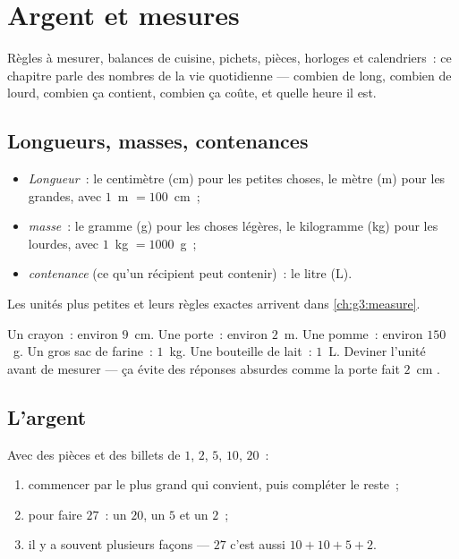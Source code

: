 \chapter{Argent et mesures}\label{ch:g2:measure}

Règles à mesurer, balances de cuisine, pichets, pièces,
horloges et calendriers~: ce chapitre parle des nombres de la vie
quotidienne --- combien de long, combien de lourd, combien ça
contient, combien ça coûte, et quelle heure il est.

\section{Longueurs, masses, contenances}

\begin{definition}\label{def:g2:measure:units}
\begin{itemize}
  \item \emph{Longueur}~: le centimètre (cm) pour les petites
        choses, le mètre (m) pour les grandes, avec
        $1$~m $= 100$~cm~;
  \item \emph{masse}~: le gramme (g) pour les choses légères, le
        kilogramme (kg) pour les lourdes, avec
        $1$~kg $= 1000$~g~;
  \item \emph{contenance} (ce qu'un récipient peut contenir)~: le
        litre (L).
\end{itemize}
Les unités plus petites et leurs règles exactes arrivent dans
\cref{ch:g3:measure}.
\end{definition}

\begin{example}\label{ex:g2:measure:choose}
Un crayon~: environ $9$~cm. Une porte~: environ $2$~m. Une pomme~:
environ $150$~g. Un gros sac de farine~: $1$~kg. Une bouteille de
lait~: $1$~L. Deviner l'unité avant de mesurer --- ça évite
des réponses absurdes comme \guillemotleft{} la porte fait
$2$~cm \guillemotright{}.
\end{example}

\section{L'argent}

\begin{method}\label{met:g2:measure:money}
Avec des pièces et des billets de $1$, $2$, $5$, $10$, $20$~:
\begin{enumerate}
  \item commencer par le plus grand qui convient, puis compléter
        le reste~;
  \item pour faire $27$~: un $20$, un $5$ et un $2$~;
  \item il y a souvent plusieurs façons --- $27$ c'est aussi
        $10 + 10 + 5 + 2$.
\end{enumerate}
\end{method}

